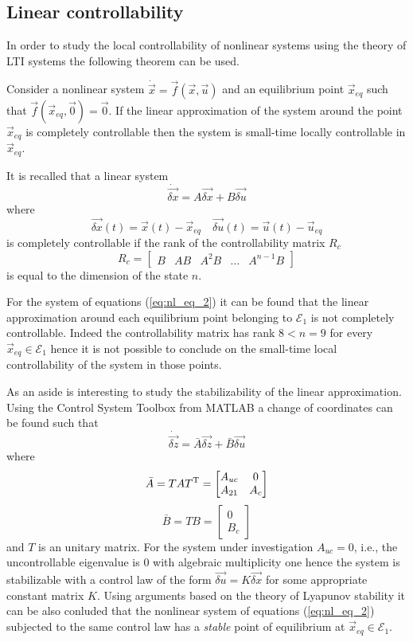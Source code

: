 \subsection{Linear controllability}
In order to study the local controllability of nonlinear systems using the theory of LTI systems
the following theorem can be used.
\begin{theorem}
  Consider a nonlinear system $\dot{\vec{x}} = \vec{f}(\vec{x}, \vec{u})$ and an equilibrium point $\vec{x}_{eq}$
  such that $\vec{f}(\vec{x}_{eq}, \vec{0}) = \vec{0}$. If the linear approximation of the system around
  the point $\vec{x}_{eq}$ is completely controllable then the system is small-time locally controllable
  in $\vec{x}_{eq}$.
\end{theorem}
It is recalled that a linear system
\[
\dot{\vec{\delta x}} = A \vec{\delta x} + B \vec{\delta u}
\]
where
\[
\vec{\delta x}(t) = \vec{x}(t) - \vec{x}_{eq} \quad \vec{\delta u}(t) = \vec{u}(t) - \vec{u}_{eq}
\]
is completely controllable if the rank of the controllability matrix $R_c$ 
\begin{equation}
R_c = 
\begin{bmatrix}
B & AB & A^2B & \dots & A^{n-1}B
\end{bmatrix}
\end{equation}
is equal to the dimension of the state $n$.
\par
For the system of equations (\ref{eq:nl_eq_2}) it can be found that the linear approximation
around each equilibrium point belonging to $\mathcal{E}_{1}$ is not completely controllable.
Indeed the controllability matrix has rank $8 < n = 9$ for every $\vec{x}_{eq} \in \mathcal{E}_1$
hence it is not possible to conclude on the small-time local controllability of the system
in those points.
\par
As an aside is interesting to study the stabilizability of the linear approximation.
Using the Control System Toolbox from MATLAB a change of coordinates can be found such that
\[
\dot{\vec{\delta z}} = \bar{A} \vec{\delta z} + \bar{B} \vec{\delta u}
\]
where
\[
\bar{A} =TAT^{\mathrm{T}} = 
\begin{bmatrix}
  A_{uc} & 0\\
  A_{21} & A_c
\end{bmatrix}
\]
\[
\bar{B} =TB = 
\begin{bmatrix}
0\\
B_c
\end{bmatrix}
\]
and $T$ is an unitary matrix. For the system under investigation
$A_{uc} = 0$, i.e., the uncontrollable eigenvalue is $0$ with algebraic multiplicity one
hence the system is stabilizable with a control law of the form $\vec{\delta u} = K \vec{\delta x}$
for some appropriate constant matrix $K$. Using arguments based on the theory of Lyapunov stability
it can be also conluded that the nonlinear system of equations (\ref{eq:nl_eq_2}) subjected to the same
control law has a \emph{stable} point of equilibrium at $\vec{x}_{eq} \in \mathcal{E}_{1}$.

